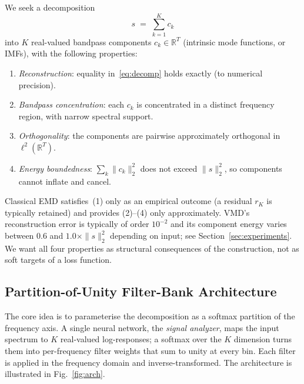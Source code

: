 \documentclass[journal]{IEEEtran}
\theoremstyle{remark}
\newcommand{\R}{\mathbb{R}}
\begin{document}
We seek a decomposition
\begin{equation}
s \;=\; \sum_{k=1}^{K} c_{k}
\label{eq:decomp}
\end{equation}
into $K$ real-valued bandpass components
$c_{k} \in \R^{T}$ (intrinsic mode functions, or IMFs), with the
following properties:
\begin{enumerate}
\item \emph{Reconstruction}: equality in~\eqref{eq:decomp} holds exactly
  (to numerical precision).
\item \emph{Bandpass concentration}: each $c_{k}$ is concentrated in a
  distinct frequency region, with narrow spectral support.
\item \emph{Orthogonality}: the components are pairwise
  approximately orthogonal in $\ell^{2}(\R^{T})$.
\item \emph{Energy boundedness}: $\sum_{k} \|c_{k}\|_{2}^{2}$ does not
  exceed $\|s\|_{2}^{2}$, so components cannot inflate and cancel.
\end{enumerate}
Classical EMD satisfies~(1) only as an empirical outcome (a residual
$r_{K}$ is typically retained) and provides (2)--(4) only approximately.
VMD's reconstruction error is typically of order $10^{-2}$ and its
component energy varies between $0.6$ and $1.0 \times \|s\|_{2}^{2}$
depending on input; see Section~\ref{sec:experiments}. We want all four
properties as structural consequences of the construction, not as soft
targets of a loss function.

\subsection{Partition-of-Unity Filter-Bank Architecture}
\label{subsec:arch}

The core idea is to parameterise the decomposition as a softmax
partition of the frequency axis. A single neural network, the
\emph{signal analyzer}, maps the input spectrum to $K$ real-valued
log-responses; a softmax over the $K$ dimension turns them into
per-frequency filter weights that sum to unity at every bin. Each filter
is applied in the frequency domain and inverse-transformed. The
architecture is illustrated in Fig.~\ref{fig:arch}.
\end{document}
